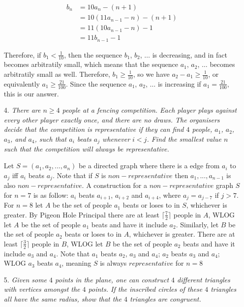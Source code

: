 \documentclass{article}
\begin{document}
\begin{enumerate}
\begin{align*}
	b_n &= 10a_n - (n + 1) \\
	 &= 10(11a_{n - 1} - n) - (n + 1) \\
	 &= 11(10a_{n - 1} - n) - 1 \\
	 &= 11b_{n - 1} - 1
\end{align*}

Therefore, if $b_1 < \frac{1}{10}$, then the sequence $b_1$, $b_2$, $\dots$ is decreasing, and in fact becomes arbitratily small, which means that the sequence $a_1$, $a_2$, $\dots$ becomes arbitratily small as well. Therefore, $b_1 \ge \frac{1}{10}$, so we have $a_2 - a_1 \ge \frac{1}{10}$, or equivalently $a_1 \ge \frac{21}{100}$. Since the sequence $a_1$, $a_2$, $\dots$ is increasing if $a_1 = \frac{21}{100}$, this is our answer.

\medskip
\item[4.] %
{\itshape There are $n \ge 4$ people at a fencing competition.
Each player plays against every other player exactly once, and there are no draws.
The organisers decide that the competition is representative if they can find $4$ people, $a_1$, $a_2$, $a_3$, and $a_4$, such that $a_i$ beats $a_j$ whenever $i < j$.
Find the smallest value $n$ such that the competition will always be representative.}

Let $S = (a_1,a_2,...,a_n)$ be a directed graph where there is a edge from $a_i$ to $a_j$ iff $a_i$ beats $a_j$. Note that if $S$ is $non-representative$ then $a_1,...,a_{n-1}$ is also $non-representative$. A construction for a $non-representative$ graph $S$ for $n=7$ is as follow: $a_i$ beats $a_{i+1}$, $a_{i+2}$ and $a_{i+4}$, where $a_j = a_{j-7}$ if $j>7$. For $n=8$ let $A$ be the set of people $a_1$ beats or loses to in $S$, whichever is greater. By Pigeon Hole Principal there are at least $\lceil{\frac{7}{2}}\rceil$ people in $A$, WLOG let $A$ be the set of people $a_1$ beats and have it include $a_2$. Similarly, let $B$ be the set of people $a_2$ beats or loses to in $A$, whichever is greater. There are at least $\lceil{\frac{3}{2}}\rceil$ people in $B$, WLOG let $B$ be the set of people $a_2$ beats and have it include $a_3$ and $a_4$. Note that $a_1$ beats $a_2$, $a_3$ and $a_4$; $a_2$ beats $a_3$ and $a_4$; WLOG $a_3$ beats $a_4$, meaning $S$ is always $representative$ for $n=8$


\medskip
\item[5.] %
{\itshape Given some $4$ points in the plane, one can construct $4$ different triangles with vertices amongst the $4$ points.
If the inscribed circles of these $4$ triangles all have the same radius, show that the $4$ triangles are congruent. }


\end{enumerate}
\end{document}
